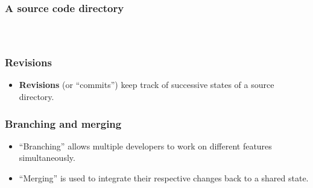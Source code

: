 \documentclass[aspectratio=169,xcolor=table]{beamer}
\begin{document}
    \begin{frame}
        \frametitle{A source code directory}

        \begin{columns}
            \begin{figure}
                \begin{minipage}{\textwidth}
            \end{minipage}
            \end{figure}
            \begin{figure}
                \centering
                \scalebox{0.9}{}
            \end{figure}
        \end{columns}
    \end{frame}

    \begin{frame}
        \frametitle{Revisions}
        \begin{block}{}
            \begin{itemize}
                \item \textbf{Revisions} (or ``commits'') keep track of
                    successive states of a source directory.
            \end{itemize}
        \end{block}
        \vfill
        \begin{figure}
            \centering
            \scalebox{0.8}{}
        \end{figure}
    \end{frame}

    \begin{frame}
        \frametitle{Branching and merging}

        \begin{block}{}
            \begin{itemize}
                \item ``Branching'' allows multiple developers to work on
                    different features simultaneously.
                \item ``Merging'' is used to integrate their respective changes
                    back to a shared state.
            \end{itemize}
        \end{block}
        \vfill
        \begin{figure}
            \centering
            \scalebox{0.8}{}
        \end{figure}
    \end{frame}
\end{document}
